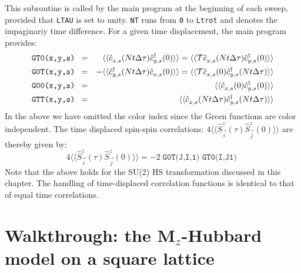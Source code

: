 This subroutine is called by the main program at the beginning of each sweep, provided that \texttt{LTAU}  is set to unity.  \texttt{NT} runs from \texttt{0}  to \texttt{Ltrot} and denotes the   impaginariy time difference.   For a given time  displacement, the main program provides:
\begin{eqnarray}
\texttt{GT0(x,y,s) }  = & &    \langle \langle \hat{c}^{\phantom\dagger}_{x,s} (Nt \Delta \tau)   \hat{c}^{\dagger}_{y,s} (0)   \rangle \rangle = \langle \langle {\cal T} \hat{c}^{\phantom\dagger}_{x,s} (Nt \Delta \tau)   \hat{c}^{\dagger}_{y,s} (0)   \rangle \rangle  \nonumber \\
\texttt{G0T(x,y,s) }   = &&  -   \langle \langle   \hat{c}^{\dagger}_{y,s} (Nt \Delta \tau)    \hat{c}^{\phantom\dagger}_{x,s} (0)    \rangle \rangle =
    \langle \langle {\cal T} \hat{c}^{\phantom\dagger}_{x,s} (0)    \hat{c}^{\dagger}_{y,s} (Nt \Delta \tau)   \rangle \rangle  \nonumber  \\
  \texttt{G00(x,y,s) }  = & &    \langle \langle \hat{c}^{\phantom\dagger}_{x,s} (0)   \hat{c}^{\dagger}_{y,s} (0)   \rangle \rangle    \nonumber \\
    \texttt{GTT(x,y,s) }  = & &    \langle \langle \hat{c}^{\phantom\dagger}_{x,s} (Nt \Delta \tau)   \hat{c}^{\dagger}_{y,s} (Nt \Delta \tau)   \rangle \rangle    
\end{eqnarray}
In the above we have omitted the color index since  the  Green functions are color independent.  The time displaced  spin-spin correlations: 
$ 4 \langle \langle \hat{S}^{z}_{\vec{i}} (\tau)  \hat{S}^{z}_{\vec{j}} (0)\rangle \rangle   $ 
are thereby given by: 
\begin{equation}
	4 \langle \langle \hat{S}^{z}_{\vec{i}} (\tau)  \hat{S}^{z}_{\vec{j}} (0)\rangle \rangle   = - 2 \; \texttt{G0T(J,I,1) } \texttt{GT0(I,J1) } 
\end{equation}
Note that the above holds for the SU(2) HS transformation discussed in this chapter. 
The handling of time-displaced correlation functions is identical to that of equal time correlations. 




\section{Walkthrough: the M$_z$-Hubbard model on a square lattice}\label{sec:walk1.1}

